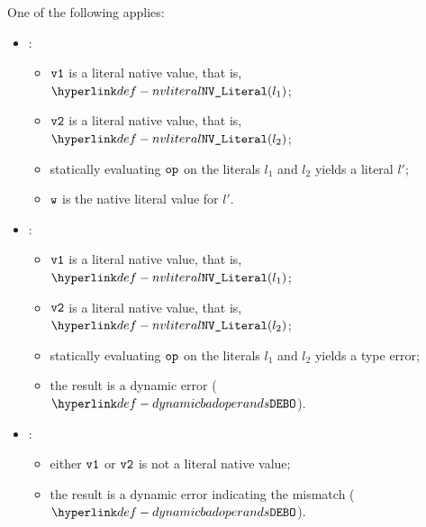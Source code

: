 \ProseParagraph
One of the following applies:
\begin{itemize}
  \item {}:
  \begin{itemize}
    \item $\vvone$ is a literal native value, that is, $\nvliteral{l_1}$;
    \item $\vvtwo$ is a literal native value, that is, $\nvliteral{l_2}$;
    \item statically evaluating $\op$ on the literals $l_1$ and $l_2$ yields a literal $l'$;
    \item $\vw$ is the native literal value for $l'$.
  \end{itemize}

  \item {}:
  \begin{itemize}
    \item $\vvone$ is a literal native value, that is, $\nvliteral{l_1}$;
    \item $\vvtwo$ is a literal native value, that is, $\nvliteral{l_2}$;
    \item statically evaluating $\op$ on the literals $l_1$ and $l_2$ yields a type error;
    \item the result is a dynamic error ($\DynamicBadOperands$).
  \end{itemize}

  \item {}:
  \begin{itemize}
    \item either $\vvone$ or $\vvtwo$ is not a literal native value;
    \item the result is a dynamic error indicating the mismatch ($\DynamicBadOperands$).
  \end{itemize}
\end{itemize}

\FormallyParagraph
\begin{mathpar}
\end{mathpar}

\begin{mathpar}
\end{mathpar}

\begin{mathpar}
\end{mathpar}
